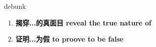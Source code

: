 
\begin{frame}
{\huge debunk}
\begin{center}
\begin{enumerate}\Large
  \item \textbf{揭穿...的真面目 reveal the true nature of}
  \item \textbf{证明...为假 to proove to be false}
\end{enumerate}
\end{center}
\end{frame}
